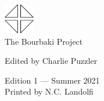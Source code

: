 




\setcounter{tocdepth}{1}
\usepackage{tocloft}
\setlength{\cftsecnumwidth}{3em}



\begin{center}
  \includegraphics[width=0.1\textwidth]{../trademark}
  \\
  \vspace{0.5cm}
  \textsf{\Large The Bourbaki Project}
  
{\small \textsf{Edited by Charlie Puzzler}}
\end{center}

\vspace{\fill}
%  


\begin{center}

  \textsf{\small Edition 1 --- Summer 2021} \\

  \textsf{\footnotesize Printed by N.C. Landolfi}

\end{center}
\thispagestyle{empty}

\clearpage

\textsf{\tableofcontents}

\clearpage




